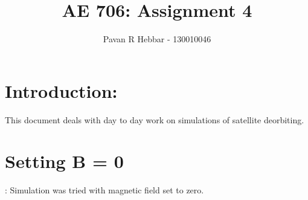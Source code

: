 \documentclass[11pt, a4paper]{article}
\title{\textbf{AE 706: Assignment 4}}
\author{Pavan R Hebbar - 130010046}
\begin{document}
\maketitle
\newpage
\tableofcontents
\newpage
\section{Introduction:}
This document deals with day to day work on simulations of satellite deorbiting.

\section{Setting B = 0}:
Simulation was tried with magnetic field set to zero. 
\end{document}
